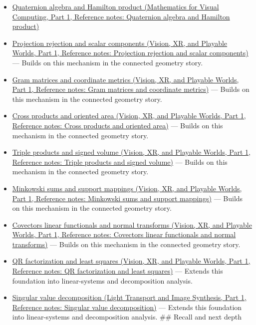 \hypertarget{appendix-8bc4e8fc547c-used-by}{}

\begin{itemize}
\item
  \href{../02-Mathematics-for-Visual-Computing-P01/main.pdf\#appendix-965d9260eeab}{Quaternion algebra and Hamilton product (Mathematics for Visual Computing, Part 1, Reference notes: Quaternion algebra and Hamilton product)}
\item
  \href{../07-Vision-XR-and-Playable-Worlds-P01/main.pdf\#appendix-505a502c372a}{Projection rejection and scalar components (Vision, XR, and Playable Worlds, Part 1, Reference notes: Projection rejection and scalar components)} --- Builds on this mechanism in the connected geometry story.
\item
  \href{../07-Vision-XR-and-Playable-Worlds-P01/main.pdf\#appendix-3b863809f82a}{Gram matrices and coordinate metrics (Vision, XR, and Playable Worlds, Part 1, Reference notes: Gram matrices and coordinate metrics)} --- Builds on this mechanism in the connected geometry story.
\item
  \href{../07-Vision-XR-and-Playable-Worlds-P01/main.pdf\#appendix-2391db8052b1}{Cross products and oriented area (Vision, XR, and Playable Worlds, Part 1, Reference notes: Cross products and oriented area)} --- Builds on this mechanism in the connected geometry story.
\item
  \href{../07-Vision-XR-and-Playable-Worlds-P01/main.pdf\#appendix-5caa058bd9c7}{Triple products and signed volume (Vision, XR, and Playable Worlds, Part 1, Reference notes: Triple products and signed volume)} --- Builds on this mechanism in the connected geometry story.
\item
  \href{../07-Vision-XR-and-Playable-Worlds-P01/main.pdf\#appendix-215ac7099a82}{Minkowski sums and support mappings (Vision, XR, and Playable Worlds, Part 1, Reference notes: Minkowski sums and support mappings)} --- Builds on this mechanism in the connected geometry story.
\item
  \href{../07-Vision-XR-and-Playable-Worlds-P01/main.pdf\#appendix-46da295c6787}{Covectors linear functionals and normal transforms (Vision, XR, and Playable Worlds, Part 1, Reference notes: Covectors linear functionals and normal transforms)} --- Builds on this mechanism in the connected geometry story.
\item
  \href{../07-Vision-XR-and-Playable-Worlds-P01/main.pdf\#appendix-c3421e6b4f2c}{QR factorization and least squares (Vision, XR, and Playable Worlds, Part 1, Reference notes: QR factorization and least squares)} --- Extends this foundation into linear-systems and decomposition analysis.
\item
  \href{../04-Light-Transport-and-Image-Synthesis-P01/main.pdf\#appendix-1fad5e7f36fa}{Singular value decomposition (Light Transport and Image Synthesis, Part 1, Reference notes: Singular value decomposition)} --- Extends this foundation into linear-systems and decomposition analysis. \#\# Recall and next depth
\end{itemize}

